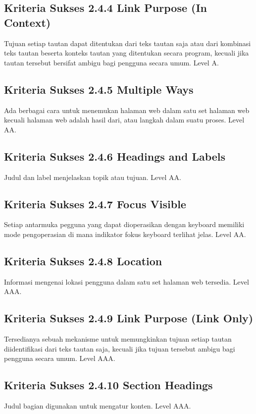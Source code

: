\subsection{Kriteria Sukses 2.4.4 Link Purpose (In Context)}
\label{sec:kriteria_2.4.4}
Tujuan setiap tautan dapat ditentukan dari teks tautan saja atau dari kombinasi teks tautan beserta konteks tautan yang ditentukan secara program, kecuali jika tautan tersebut bersifat ambigu bagi pengguna secara umum.
Level A.

\subsection{Kriteria Sukses 2.4.5 Multiple Ways}
\label{sec:kriteria_2.4.5}
Ada berbagai cara untuk menemukan halaman web dalam satu set halaman web kecuali halaman web adalah hasil dari, atau langkah dalam suatu proses.
Level AA.

\subsection{Kriteria Sukses 2.4.6 Headings and Labels}
\label{sec:kriteria_2.4.6}
Judul dan label menjelaskan topik atau tujuan.
Level AA.

\subsection{Kriteria Sukses 2.4.7 Focus Visible}
\label{sec:kriteria_2.4.7}
Setiap antarmuka pegguna yang dapat dioperasikan dengan keyboard memiliki mode pengoperasian di mana indikator fokus keyboard terlihat jelas.
Level AA.

\subsection{Kriteria Sukses 2.4.8 Location}
\label{sec:kriteria_2.4.8}
Informasi mengenai lokasi pengguna dalam satu set halaman web tersedia.
Level AAA.

\subsection{Kriteria Sukses 2.4.9 Link Purpose (Link Only)}
\label{sec:kriteria_2.4.9}
Tersedianya sebuah mekanisme untuk memungkinkan tujuan setiap tautan diidentifikasi dari teks tautan saja, kecuali jika tujuan tersebut ambigu bagi pengguna secara umum.
Level AAA.

\subsection{Kriteria Sukses 2.4.10 Section Headings}
\label{sec:kriteria_2.4.10}
Judul bagian digunakan untuk mengatur konten.
Level AAA.

